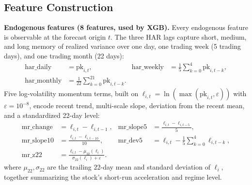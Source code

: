 \documentclass[runningheads,a4paper]{llncs}
\begin{document}
\subsection{Feature Construction}
\textbf{Endogenous features (8 features, used by XGB).} Every endogenous feature is observable at the
forecast origin $t$. The three HAR lags capture short, medium, and long memory of realized variance
over one day, one trading week (5 trading days), and one trading month (22 days):
\begin{align}
\mathrm{har\_daily} &= \mathrm{pk}_{i,t}, &
\mathrm{har\_weekly} &= \frac{1}{5}\sum_{k=0}^{4}\mathrm{pk}_{i,t-k},\\
\mathrm{har\_monthly} &= \frac{1}{22}\sum_{k=0}^{21}\mathrm{pk}_{i,t-k}. &&
\end{align}
Five log-volatility momentum terms, built on $\ell_{i,t}=\ln(\max(\mathrm{pk}_{i,t},\varepsilon))$ with
$\varepsilon=10^{-8}$, encode recent trend, multi-scale slope, deviation from the recent mean, and a
standardized 22-day level:
\begin{align}
\mathrm{mr\_change} &= \ell_{i,t}-\ell_{i,t-1}, &
\mathrm{mr\_slope5} &= \frac{\ell_{i,t}-\ell_{i,t-5}}{5},\\
\mathrm{mr\_slope10} &= \frac{\ell_{i,t}-\ell_{i,t-10}}{10}, &
\mathrm{mr\_dev5} &= \ell_{i,t}-\frac{1}{5}\sum_{k=0}^{4}\ell_{i,t-k},\\
\mathrm{mr\_z22} &= \frac{\ell_{i,t}-\mu_{22}(\ell_i)}{\sigma_{22}(\ell_i)+\varepsilon}. &&
\end{align}
where $\mu_{22},\sigma_{22}$ are the trailing 22-day mean and standard deviation of $\ell_i$, together
summarizing the stock's short-run acceleration and regime level.
\end{document}
